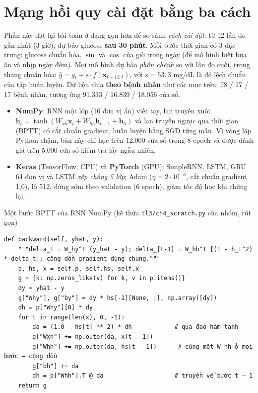 
\section{Mạng hồi quy cài đặt bằng ba cách}
\label{sec:ch4-three}

Phần này đặt lại bài toán ở dạng gọn hơn để so sánh \emph{cách cài đặt}: từ 12 lần đo gần nhất (3 giờ), dự báo glucose \textbf{sau 30 phút}. Mỗi bước thời gian có 3 đặc trưng: glucose chuẩn hóa, $\sin$ và $\cos$ của giờ trong ngày (để mô hình biết bữa ăn và nhịp ngày đêm). Mọi mô hình dự báo \emph{phần chênh} so với lần đo cuối, trong thang chuẩn hóa: $\hat y = g_{t} + s\cdot f(\mathbf x_{t-11:t})$, với $s=53{,}3$ mg/dL là độ lệch chuẩn của tập huấn luyện. Dữ liệu chia \textbf{theo bệnh nhân} như các mục trên: 78 / 17 / 17 bệnh nhân, tương ứng 91.333 / 16.839 / 18.056 cửa sổ.

\begin{itemize}
  \item \textbf{NumPy}: RNN một lớp (16 đơn vị ẩn) viết tay, lan truyền xuôi $\mathbf h_t=\tanh(W_{xh}\mathbf x_t+W_{hh}\mathbf h_{t-1}+\mathbf b_h)$ và lan truyền ngược qua thời gian (BPTT) có cắt chuẩn gradient, huấn luyện bằng SGD từng mẫu. Vì vòng lặp Python chậm, bản này chỉ học trên 12.000 cửa sổ trong 8 epoch và được đánh giá trên 5.000 cửa sổ kiểm tra lấy ngẫu nhiên.
  \item \textbf{Keras} (TensorFlow, CPU) và \textbf{PyTorch} (GPU): SimpleRNN, LSTM, GRU 64 đơn vị và LSTM \emph{xếp chồng 5 lớp}; Adam ($\eta=2\cdot10^{-3}$, cắt chuẩn gradient 1,0), lô 512, dừng sớm theo validation (6 epoch), giảm tốc độ học khi chững lại.
\end{itemize}

\begin{code}{Một bước BPTT của RNN NumPy (kế thừa \texttt{tl3/ch4\_scratch.py} của nhóm, rút gọn)}
\label{lst:ch4-bptt}
\begin{verbatim}
def backward(self, yhat, y):
    """delta_T = W_hy^T (y_hat - y); delta_{t-1} = W_hh^T [(1 - h_t^2) * delta_t]; cộng dồn gradient dùng chung."""
    p, hs, x = self.p, self.hs, self.x
    g = {k: np.zeros_like(v) for k, v in p.items()}
    dy = yhat - y
    g["Why"], g["by"] = dy * hs[-1][None, :], np.array([dy])
    dh = p["Why"][0] * dy
    for t in range(len(x), 0, -1):
        da = (1.0 - hs[t] ** 2) * dh            # qua đạo hàm tanh
        g["Wxh"] += np.outer(da, x[t - 1])
        g["Whh"] += np.outer(da, hs[t - 1])      # cùng một W_hh ở mọi bước → cộng dồn
        g["bh"] += da
        dh = p["Whh"].T @ da                    # truyền về bước t − 1
    return g
\end{verbatim}
\end{code}

